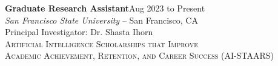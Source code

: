 \documentclass[hidelinks, 10pt]{article}
\begin{document}
{{\vspace{4mm}

\begin{minipage}[ct]{0.9\linewidth}
\textbf{Graduate Research Assistant}\hfill Aug 2023 to Present\\
\emph{San Francisco State University} -- San Francisco, CA\\
Principal Investigator: Dr. Shasta Ihorn\\
{\textsc{Artificial Intelligence Scholarships that Improve \\Academic Achievement, Retention, and Career Success (AI-STAARS)}}
\vspace{1mm}\\
\lipsum[1]
\end{minipage}

\vspace{4mm}

}}
\end{document}
